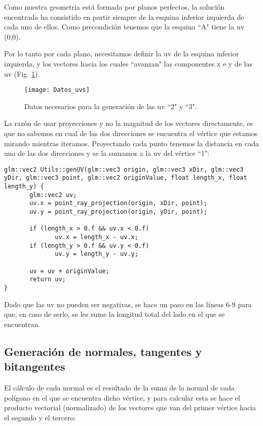 Como nuestra geometría está formada por planos perfectos, la solución encontrada ha consistido en partir siempre de la esquina inferior izquierda de cada uno de ellos. Como precondición tenemos que la esquina ``A" tiene la uv (0,0).

Por lo tanto por cada plano, necesitamos definir la uv de la esquina inferior izquierda, y los vectores hacia los cuales ``avanzan" las componentes x e y de las uv (Fig. \ref{fig:datos_uvs}).

\begin{figure}[H]
    \centering
    \texttt{[image: Datos\_uvs]}
    \caption{Datos necesarios para la generación de las uv ``2" y ``3".}
    \label{fig:datos_uvs}
\end{figure}

La razón de usar proyecciones y no la magnitud de los vectores directamente, es que no sabemos en cual de las dos direcciones se encuentra el vértice que estamos mirando mientras iteramos. Proyectando cada punto tenemos la distancia en cada una de las dos direcciones y se la sumamos a la uv del vértice ``1":

\begin{lstlisting}
glm::vec2 Utils::genUV(glm::vec3 origin, glm::vec3 xDir, glm::vec3 yDir, glm::vec3 point, glm::vec2 originValue, float length_x, float length_y) {
       glm::vec2 uv;
       uv.x = point_ray_projection(origin, xDir, point);
       uv.y = point_ray_projection(origin, yDir, point);

       if (length_x > 0.f && uv.x < 0.f)
              uv.x = length_x - uv.x;
       if (length_y > 0.f && uv.y < 0.f)
              uv.y = length_y - uv.y;

       uv = uv + originValue;
       return uv;
}
\end{lstlisting}

Dado que las uv no pueden ser negativas, se hace un paso en las líneas 6-9 para que, en caso de serlo, se les sume la longitud total del lado en el que se encuentran.

\subsection{Generación de normales, tangentes y bitangentes}
El cálculo de cada normal es el resultado de la suma de la normal de cada polígono en el que se encuentra dicho vértice, y para calcular esta se hace el producto vectorial (normalizado) de los vectores que van del primer vértice hacia el segundo y el tercero:

